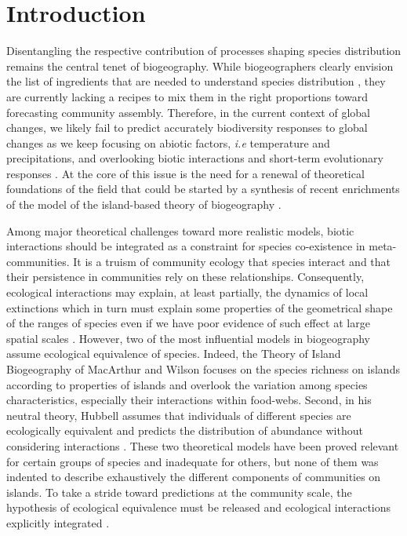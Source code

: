 \section{Introduction}\label{introduction}

Disentangling the respective contribution of processes shaping species
distribution remains the central tenet of biogeography. While
biogeographers clearly envision the list of ingredients that are needed
to understand species distribution \citep{Thuiller2013}, they are
currently lacking a recipes to mix them in the right proportions toward
forecasting community assembly. Therefore, in the current context of
global changes, we likely fail to predict accurately biodiversity
responses to global changes as we keep focusing on abiotic factors,
\emph{i.e} temperature and precipitations, and overlooking biotic
interactions and short-term evolutionary responses \citep{Lavergne2010}.
At the core of this issue is the need for a renewal of theoretical
foundations of the field that could be started by a synthesis of recent
enrichments of the model of the island-based theory of biogeography
\citep{Lomolino2000a, Warren2015}.

Among major theoretical challenges toward more realistic models, biotic
interactions should be integrated as a constraint for species
co-existence in meta-communities. It is a truism of community ecology
that species interact and that their persistence in communities rely on
these relationships. Consequently, ecological interactions may explain,
at least partially, the dynamics of local extinctions which in turn must
explain some properties of the geometrical shape of the ranges of
species \citep{Holt2009, Cazelles2015a} even if we have poor evidence of
such effect at large spatial scales \citep[but see][]{Gotelli2010}.
However, two of the most influential models in biogeography assume
ecological equivalence of species. Indeed, the Theory of Island
Biogeography of MacArthur and Wilson \citep[hereafter
TIB,][]{MacArthur1967} focuses on the species richness on islands
according to properties of islands and overlook the variation among
species characteristics, especially their interactions within food-webs.
Second, in his neutral theory, Hubbell assumes that individuals of
different species are ecologically equivalent and predicts the
distribution of abundance without considering interactions
\citep{Hubbell1997}. These two theoretical models have been proved
relevant for certain groups of species and inadequate for others, but
none of them was indented to describe exhaustively the different
components of communities on islands. To take a stride toward
predictions at the community scale, the hypothesis of ecological
equivalence must be released and ecological interactions explicitly
integrated \citep{Holt2010, Gravel2011}.

